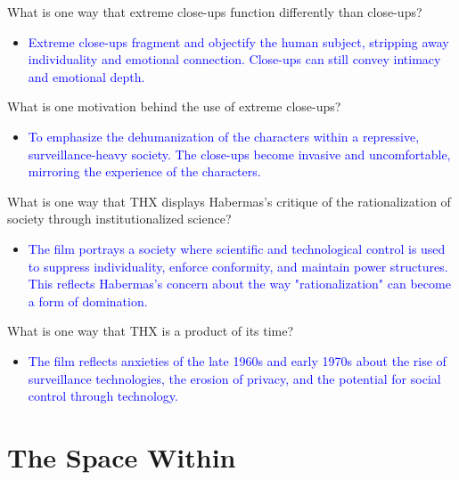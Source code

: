 \documentclass[11pt,fleqn]{book}
\begin{document}
\begin{exercise}
What is one way that extreme close-ups function differently than close-ups?
\begin{itemize}
\item \textcolor{blue}{Extreme close-ups fragment and objectify the human subject, stripping away individuality and emotional connection. Close-ups can still convey intimacy and emotional depth.}
\end{itemize}
\end{exercise}

\begin{exercise}
What is one motivation behind the use of extreme close-ups?
\begin{itemize}
\item \textcolor{blue}{To emphasize the dehumanization of the characters within a repressive, surveillance-heavy society. The close-ups become invasive and uncomfortable, mirroring the experience of the characters.}
\end{itemize}
\end{exercise}

\begin{exercise}
What is one way that THX displays Habermas's critique of the rationalization of society through institutionalized science?
\begin{itemize}
\item \textcolor{blue}{The film portrays a society where scientific and technological control is used to suppress individuality, enforce conformity, and maintain power structures. This reflects Habermas's concern about the way "rationalization" can become a form of domination.}
\end{itemize}
\end{exercise}

\begin{exercise}
What is one way that THX is a product of its time?
\begin{itemize}
\item \textcolor{blue}{The film reflects anxieties of the late 1960s and early 1970s about the rise of surveillance technologies, the erosion of privacy, and the potential for social control through technology.}
\end{itemize}
\end{exercise}





\section{The Space Within}
\end{document}
